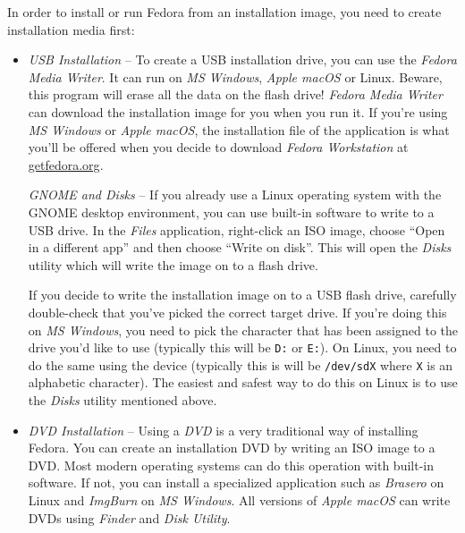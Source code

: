In order to install or run Fedora from an installation image, you need to create installation media first:
\begin{itemize}
\item\emph{USB Installation} -- To create a USB installation drive, you can use the \emph{Fedora Media Writer}. It can run on \emph{MS Windows}, \emph{Apple macOS} or Linux. Beware, this program will erase all the data on the flash drive! \emph{Fedora Media Writer} can download the installation image for you when you run it. If you're using \emph{MS Windows} or \emph{Apple macOS}, the installation file of the application is what you'll be offered when you decide to download \emph{Fedora Workstation} at \url{getfedora.org}.

\emph{GNOME and Disks} -- If you already use a Linux operating system with the GNOME desktop environment, you can use built-in software to write to a USB drive. In the \emph{Files} application, right-click an ISO image, choose \enquote{Open in a different app} and then choose \enquote{Write on disk}. This will open the \emph{Disks} utility which will write the image on to a flash drive.

If you decide to write the installation image on to a USB flash drive, carefully double-check that you've picked the correct target drive. If you're doing this on \emph{MS Windows}, you need to pick the character that has been assigned to the drive you'd like to use (typically this will be \texttt{D:} or \texttt{E:}). On Linux, you need to do the same using the device (typically this is will be \texttt{/dev/sdX} where \texttt{X} is an alphabetic character). The easiest and safest way to do this on Linux is to use the \emph{Disks} utility mentioned above.

\item\emph{DVD Installation} -- Using a \emph{DVD} is a very traditional way of installing Fedora. You can create an installation DVD by writing an ISO image to a DVD. Most modern operating systems can do this operation with built-in software. If not, you can install a specialized application such as \emph{Brasero} on Linux and \emph{ImgBurn} on \emph{MS Windows}. All versions of \emph{Apple macOS} can write DVDs using \emph{Finder} and \emph{Disk Utility}.
\end{itemize}


